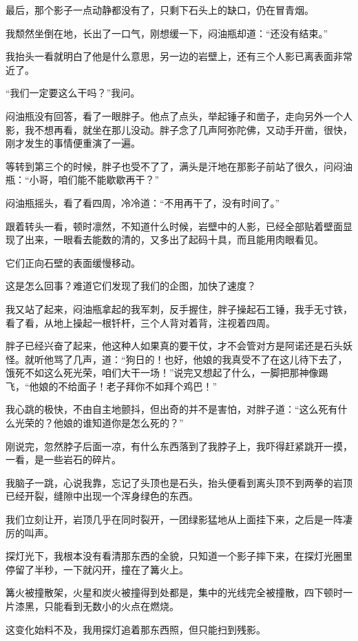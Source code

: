 最后，那个影子一点动静都没有了，只剩下石头上的缺口，仍在冒青烟。

我颓然坐倒在地，长出了一口气，刚想缓一下，闷油瓶却道：“还没有结束。”

我抬头一看就明白了他是什么意思，另一边的岩壁上，还有三个人影已离表面非常近了。

“我们一定要这么干吗？”我问。

闷油瓶没有回答，看了一眼胖子。他点了点头，举起锤子和凿子，走向另外一个人影，我不想再看，就坐在那儿没动。胖子念了几声阿弥陀佛，又动手开凿，很快，刚才发生的事情便重演了一遍。

等转到第三个的时候，胖子也受不了了，满头是汗地在那影子前站了很久，问闷油瓶：“小哥，咱们能不能歇歇再干？”

闷油瓶摇头，看了看四周，冷冷道：“不用再干了，没有时间了。”

跟着转头一看，顿时凛然，不知道什么时候，岩壁中的人影，已经全部贴着壁面显现了出来，一眼看去能数的清的，又多出了起码十具，而且能用肉眼看见。

它们正向石壁的表面缓慢移动。

这是怎么回事？难道它们发现了我们的企图，加快了速度？

我又站了起来，闷油瓶拿起的我军刺，反手握住，胖子操起石工锤，我手无寸铁，看了看，从地上操起一根钎杆，三个人背对着背，注视着四周。

胖子已经兴奋了起来，他这种人如果真的要干仗，才不会管对方是阿诺还是石头妖怪。就听他骂了几声，道：“狗日的！也好，他娘的我真受不了在这儿待下去了，饿死不如这么死光荣，咱们大干一场！”说完又想起了什么，一脚把那神像踢飞，“他娘的不给面子！老子拜你不如拜个鸡巴！”

我心跳的极快，不由自主地颤抖，但出奇的并不是害怕，对胖子道：“这么死有什么光荣的？他娘的谁知道你是怎么死的？”

刚说完，忽然脖子后面一凉，有什么东西落到了我脖子上，我吓得赶紧跳开一摸，一看，是一些岩石的碎片。

我脑子一跳，心说我靠，忘记了头顶也是石头，抬头便看到离头顶不到两拳的岩顶已经开裂，缝隙中出现一个浑身绿色的东西。

我们立刻让开，岩顶几乎在同时裂开，一团绿影猛地从上面挂下来，之后是一阵凄厉的叫声。

探灯光下，我根本没有看清那东西的全貌，只知道一个影子摔下来，在探灯光圈里停留了半秒，一下就闪开，撞在了篝火上。

篝火被撞散架，火星和炭火被撞得到处都是，集中的光线完全被撞散，四下顿时一片漆黑，只能看到无数小的火点在燃烧。

这变化始料不及，我用探灯追着那东西照，但只能扫到残影。

